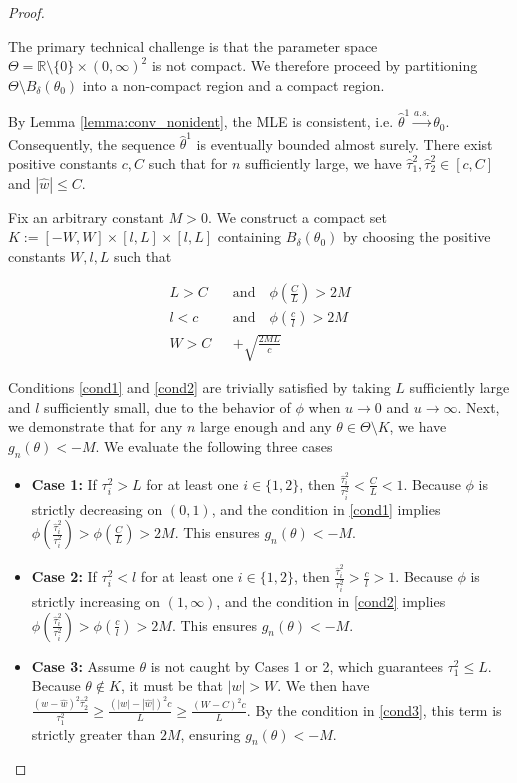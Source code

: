 \documentclass[accepted]{uai2026} %
\theoremstyle{boldremark}
\begin{document}
\begin{proof}
\begin{itemize}
The primary technical challenge is that the parameter space $\Theta = \mathbb{R}\setminus\{0\}\times (0, \infty)^2$ is not compact. We therefore proceed by partitioning $\Theta \setminus B_\delta(\theta_0)$ into a non-compact region and a compact region.

By Lemma \ref{lemma:conv_nonident}, the MLE is consistent, i.e. $\hat{\theta}^1 \xrightarrow{a.s.} \theta_0$. Consequently, the sequence $\hat{\theta}^1$ is eventually bounded almost surely. There exist positive constants $c, C$ such that for $n$ sufficiently large, we have $\hat{\tau}_1^2, \hat{\tau}_2^2 \in [c, C]$ and $|\hat{w}| \leq C$.


Fix an arbitrary constant $M > 0$. We construct a compact set $K := [-W, W] \times [l, L] \times [l, L]$ containing $B_\delta(\theta_0)$ by choosing the positive constants $W, l, L$ such that

\begin{align}
    \label{cond1}
    L > C \quad &\text{and}\quad \phi\left(\frac{C}{L} \right) > 2M\\
    \label{cond2}
    l < c \quad &\text{and}\quad  \phi\left(\frac{c}{l} \right) > 2M\\
    \label{cond3}
    W > C &+ \sqrt{\frac{2ML}{c}}
\end{align}


Conditions \eqref{cond1} and \eqref{cond2} are trivially satisfied by taking $L$ sufficiently large and $l$ sufficiently small, due to the behavior of $\phi$ when  $u \to 0$ and $u \to \infty$. Next, we demonstrate that for any $n$ large enough and any $\theta \in \Theta \setminus K$, we have $g_n(\theta) < -M$. We evaluate the following three cases

\begin{itemize}
    \item \textbf{Case 1:} If $\tau_i^2 > L$ for at least one $i \in \{1,2\}$, then $\frac{\hat{\tau}_i^2}{\tau_i^2} < \frac{C}{L} < 1$. Because $\phi$ is strictly decreasing on $(0, 1)$, and the condition in \eqref{cond1} implies $\phi\left( \frac{\hat{\tau}_i^2}{\tau_i^2} \right) > \phi\left(\frac{C}{L}\right) > 2M$. This ensures $g_n(\theta) < -M$.
    \item \textbf{Case 2:} If $\tau_i^2 < l$ for at least one $i \in \{1,2\}$, then $\frac{\hat{\tau}_i^2}{\tau_i^2} > \frac{c}{l} > 1$. Because $\phi$ is strictly increasing on $(1, \infty)$, and the condition in \eqref{cond2} implies $\phi\left( \frac{\hat{\tau}_i^2}{\tau_i^2} \right) > \phi\left(\frac{c}{l}\right) > 2M$. This ensures $g_n(\theta) < -M$.
    \item \textbf{Case 3:} Assume $\theta$ is not caught by Cases 1 or 2, which guarantees $\tau_1^2 \leq L$. Because $\theta \notin K$, it must be that $|w| > W$. We then have $\frac{(w-\hat{w})^2\hat{\tau}_2^2}{\tau_1^2} \geq \frac{(|w|-|\hat{w}|)^2 c}{L} \geq \frac{(W-C)^2 c}{L}$. By the condition in \eqref{cond3}, this term is strictly greater than $2M$, ensuring $g_n(\theta) < -M$.
\end{itemize}


\end{itemize}
\end{proof}
\end{document}
